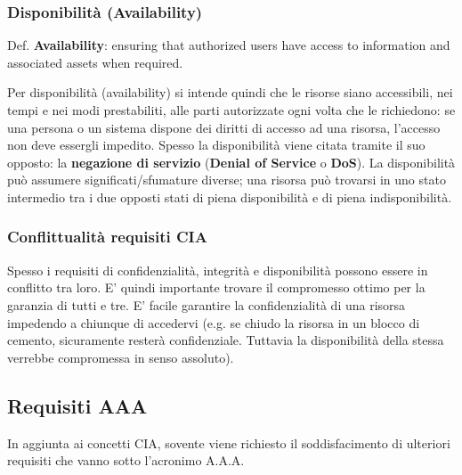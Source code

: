 \subsubsection{Disponibilità (Availability)}
 Def. \textbf{Availability}: ensuring that authorized users have access to information and associated assets when required. \newline

Per disponibilità (availability) si intende quindi che le risorse siano accessibili, nei tempi e nei modi prestabiliti, alle parti autorizzate ogni volta che le richiedono: se una persona o un sistema dispone dei diritti di accesso ad una risorsa, l’accesso non deve essergli impedito. Spesso la disponibilità viene citata tramite il suo opposto: la \textbf{negazione di servizio} (\textbf{Denial of Service} o \textbf{DoS}). La disponibilità può assumere significati/sfumature diverse; una risorsa può trovarsi in uno stato intermedio tra i due opposti stati di piena disponibilità e di piena indisponibilità.

\subsubsection{Conflittualità requisiti CIA}
Spesso i requisiti di confidenzialità, integrità e disponibilità possono essere in conflitto tra loro. E' quindi importante trovare il compromesso ottimo per la garanzia di tutti e tre. E' facile garantire la confidenzialità di una risorsa impedendo a chiunque di accedervi (e.g. se chiudo la risorsa in un blocco di cemento, sicuramente resterà confidenziale. Tuttavia la disponibilità della stessa verrebbe compromessa in senso assoluto).

\subsection{Requisiti AAA}
In aggiunta ai concetti CIA, sovente viene richiesto il soddisfacimento di ulteriori requisiti che vanno sotto l’acronimo A.A.A.

